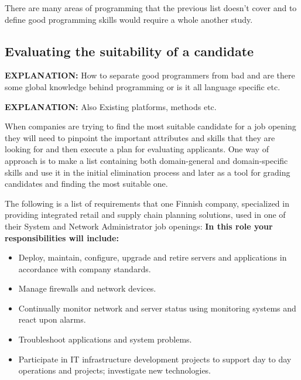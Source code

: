 \documentclass[11pt,a4paper,oneside,article]{memoir}
\begin{document}
There are many areas of programming that the previous list doesn't cover and to define good programming skills would require a whole another study. 

\subsection{Evaluating the suitability of a candidate}
\label{sec:evaluating}
\textbf{EXPLANATION:} How to separate good programmers from bad and are there some global knowledge behind programming or is it all language specific etc. %

\textbf{EXPLANATION:} Also Existing platforms, methods etc.

When companies are trying to find the most suitable candidate for a job opening they will need to pinpoint the important attributes and skills that they are looking for and then execute a plan for evaluating applicants. One way of approach is to make a list containing both domain-general and domain-specific skills and use it in the initial elimination process and later as a tool for grading candidates and finding the most suitable one.

The following is a list of requirements that one Finnish company, specialized in providing integrated retail and supply chain planning solutions, used in one of their System and Network Administrator job openings: \cite{relex:apply}\newline
\textbf{In this role your responsibilities will include:}
\vspace{-17pt} 
\begin{itemize}
\item Deploy, maintain, configure, upgrade and retire servers and applications in accordance with company standards.
\item Manage firewalls and network devices.
\item Continually monitor network and server status using monitoring systems and react upon alarms.
\item Troubleshoot applications and system problems.
\item Participate in IT infrastructure development projects to support day to day operations and projects; investigate new technologies.
\end{itemize}
\vspace{-17pt}
\end{document}
